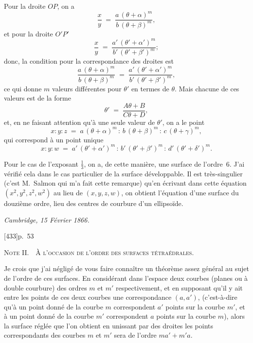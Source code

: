 \documentclass[11pt,a4paper]{article}
\begin{document}
Pour la droite $OP$, on a
\[
\frac{x}{y} \;=\; \frac{a\,(\theta + \alpha)^{m}}{b\,(\theta + \beta)^{m}},
\]
et pour la droite $O'P'$
\[
\frac{x}{y} \;=\; \frac{a'\,(\theta' + \alpha')^{m}}{b'\,(\theta' + \beta')^{m}};
\]
donc, la condition pour la correspondance des droites est
\[
\frac{a\,(\theta + \alpha)^{m}}{b\,(\theta + \beta)^{m}}
   \;=\; \frac{a'\,(\theta' + \alpha')^{m}}{b'\,(\theta' + \beta')^{m}},
\]
ce qui donne $m$ valeurs diff\'erentes pour $\theta'$ en termes de $\theta$. Mais
chacune de ces valeurs est de la forme
\[
\theta' \;=\; \frac{A\theta + B}{C\theta + D},
\]
et, en ne faisant attention qu'\`a une seule valeur de $\theta'$, on a le point
\[
x : y : z \;=\; a\,(\theta + \alpha)^{m} \,:\,
                b\,(\theta + \beta)^{m}  \,:\,
                c\,(\theta + \gamma)^{m},
\]
qui correspond \`a un point unique
\[
x : y : w \;=\; a'\,(\theta' + \alpha')^{m} \,:\,
                b'\,(\theta' + \beta')^{m}  \,:\,
                d'\,(\theta' + \delta')^{m}.
\]

Pour le cas de l'exposant $\tfrac{1}{3}$, on a, de cette mani\`ere, une surface
de l'ordre~6. J'ai v\'erifi\'e cela dans le cas particulier de la surface
d\'eveloppable. Il est tr\`es-singulier (c'est M.\ Salmon qui m'a fait cette
remarque) qu'en \'ecrivant dans cette \'equation $(x^{2},y^{2},z^{2},w^{2})$ au
lieu de $(x,y,z,w)$, on obtient l'\'equation d'une surface du douzi\`eme ordre,
lieu des centres de courbure d'un ellipso\"ide.

\begin{flushright}
\textit{Cambridge, 15 F\'evrier 1866.}
\end{flushright}

\bigskip

\begin{flushright}\small [433]\quad p.~53\end{flushright}

\medskip\noindent
\textsc{Note II.\ \ \`A l'occasion de l'ordre des surfaces t\'etra\'edrales.}
\medskip

Je crois que j'ai n\'eglig\'e de vous faire conna\^itre un th\'eor\`eme assez
g\'en\'eral au sujet de l'ordre de ces surfaces. En consid\'erant dans l'espace
deux courbes (planes ou \`a double courbure) des ordres $m$ et $m'$
respectivement, et en supposant qu'il y ait entre les points de ces deux courbes
une correspondance $(a, a')$, (c'est-\`a-dire qu'\`a un point donn\'e de la
courbe $m$ correspondent $a'$ points sur la courbe $m'$, et \`a un point donn\'e
de la courbe $m'$ correspondent $a$ points sur la courbe $m$), alors la surface
r\'egl\'ee que l'on obtient en unissant par des droites les points correspondants
des courbes $m$ et $m'$ sera de l'ordre $ma' + m'a$.
\end{document}

